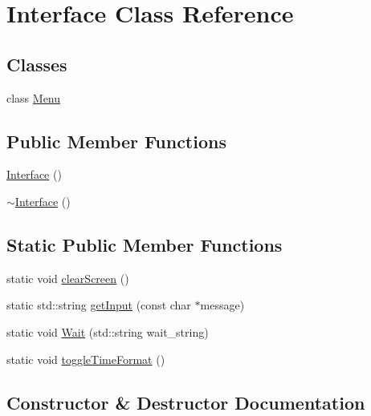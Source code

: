 \hypertarget{classInterface}{}\section{Interface Class Reference}
\label{classInterface}
\subsection*{Classes}
\begin{DoxyCompactItemize}
\item 
class \hyperlink{classInterface_1_1Menu}{Menu}
\end{DoxyCompactItemize}
\subsection*{Public Member Functions}
\begin{DoxyCompactItemize}
\item 
\hyperlink{classInterface_a4406d74c75bdfe150bf72be1f1cda8b1}{Interface} ()
\item 
\hyperlink{classInterface_a19179888f29f18f1be54a3dfe98f68c0}{$\sim$\+Interface} ()
\end{DoxyCompactItemize}
\subsection*{Static Public Member Functions}
\begin{DoxyCompactItemize}
\item 
static void \hyperlink{classInterface_af92bb2aeecc6a19095af23fa78b49451}{clear\+Screen} ()
\item 
static std\+::string \hyperlink{classInterface_aa5c0539404373d488986f030f7a84a6f}{get\+Input} (const char $\ast$message)
\item 
static void \hyperlink{classInterface_ab235ba2f0184e3fbfd5d5a64d5eb85ef}{Wait} (std\+::string wait\+\_\+string)
\item 
static void \hyperlink{classInterface_a2e002e61dc11cf4a1bd9c039704194df}{toggle\+Time\+Format} ()
\end{DoxyCompactItemize}


\subsection{Constructor \& Destructor Documentation}
